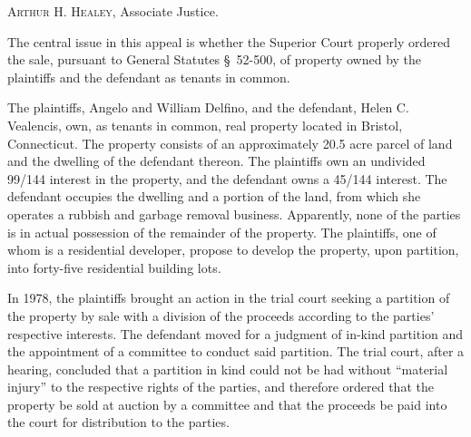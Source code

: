 
\textsc{Arthur H. Healey}, Associate Justice.

The central issue in this appeal is whether the Superior Court properly ordered
the sale, pursuant to General Statutes \S~52-500, of property owned by the plaintiffs and the defendant
as tenants in common.

The plaintiffs, Angelo and William Delfino, and the defendant, Helen C.
Vealencis, own, as tenants in common, real property located in Bristol,
Connecticut. The property consists of an approximately 20.5 acre parcel of land
and the dwelling of the defendant thereon. The plaintiffs own an undivided
99/144 interest in the property, and the defendant owns a 45/144 interest. The
defendant occupies the dwelling and a portion of the land, from which she
operates a rubbish and garbage removal
business. Apparently, none of the parties is in actual
possession of the remainder of the property. The plaintiffs, one of whom is a
residential developer, propose to develop the property, upon partition, into
forty-five residential building lots.


In 1978, the plaintiffs brought an action in the trial court seeking a partition
of the property by sale with a division of the proceeds according to the
parties' respective interests. The defendant moved for a judgment of in-kind
partition and the appointment of a committee to conduct said partition. The
trial court, after a hearing, concluded that a partition in kind could not be
had without ``material injury'' to the respective rights of the parties, and
therefore ordered that the property be sold at auction by a committee and that
the proceeds be paid into the court for distribution to the parties.

